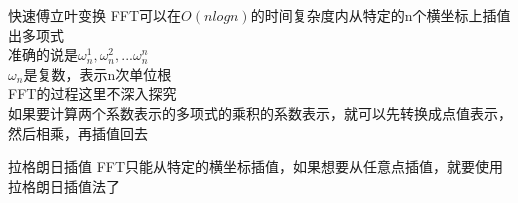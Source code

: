 \documentclass{beamer}
\begin{document}
\begin{frame}{快速傅立叶变换}
FFT可以在$O(nlogn)$的时间复杂度内从特定的n个横坐标上插值出多项式\\
准确的说是$\omega_n^1,\omega_n^2,...\omega_n^n$\\
$\omega_n$是复数，表示n次单位根\\
FFT的过程这里不深入探究\\
如果要计算两个系数表示的多项式的乘积的系数表示，就可以先转换成点值表示，然后相乘，再插值回去
\end{frame}

\begin{frame}{拉格朗日插值}
FFT只能从特定的横坐标插值，如果想要从任意点插值，就要使用拉格朗日插值法了\\

\end{frame}
\end{document}
